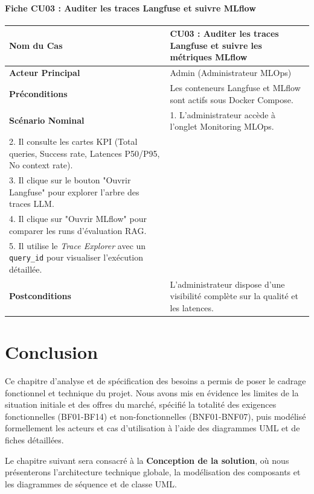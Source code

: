 \paragraph{Fiche CU03 : Auditer les traces Langfuse et suivre MLflow}
\begin{table}[htbp]
\centering
\small
\begin{tabular}{|p{3.2cm}|p{10.3cm}|}
\hline
\textbf{Nom du Cas} & \textbf{CU03 : Auditer les traces Langfuse et suivre les métriques MLflow} \\ \hline
\textbf{Acteur Principal} & Admin (Administrateur MLOps) \\ \hline
\textbf{Préconditions} & Les conteneurs Langfuse et MLflow sont actifs sous Docker Compose. \\ \hline
\textbf{Scénario Nominal} & 
1. L'administrateur accède à l'onglet Monitoring MLOps.\\
2. Il consulte les cartes KPI (Total queries, Success rate, Latences P50/P95, No context rate).\\
3. Il clique sur le bouton "Ouvrir Langfuse" pour explorer l'arbre des traces LLM.\\
4. Il clique sur "Ouvrir MLflow" pour comparer les runs d'évaluation RAG.\\
5. Il utilise le \textit{Trace Explorer} avec un \texttt{query\_id} pour visualiser l'exécution détaillée. \\ \hline
\textbf{Postconditions} & L'administrateur dispose d'une visibilité complète sur la qualité et les latences. \\ \hline
\end{tabular}
\end{table}

\section{Conclusion}
Ce chapitre d'analyse et de spécification des besoins a permis de poser le cadrage fonctionnel et technique du projet. Nous avons mis en évidence les limites de la situation initiale et des offres du marché, spécifié la totalité des exigences fonctionnelles (BF01-BF14) et non-fonctionnelles (BNF01-BNF07), puis modélisé formellement les acteurs et cas d'utilisation à l'aide des diagrammes UML et de fiches détaillées.

Le chapitre suivant sera consacré à la \textbf{Conception de la solution}, où nous présenterons l'architecture technique globale, la modélisation des composants et les diagrammes de séquence et de classe UML.
